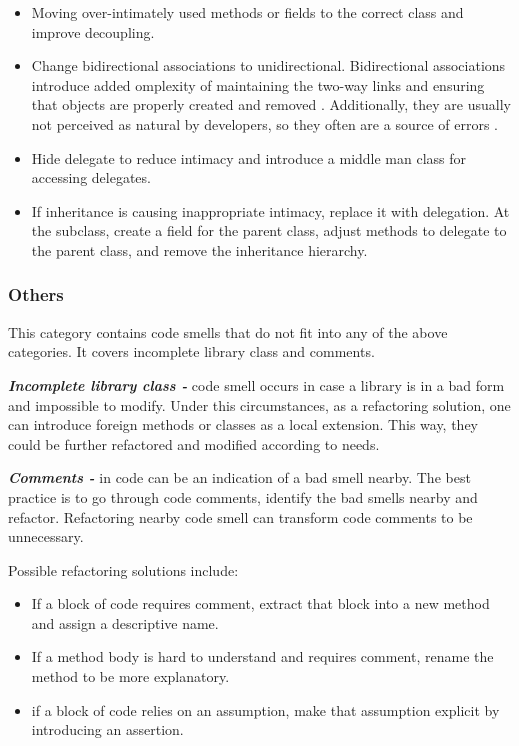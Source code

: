 \begin{itemize}
\item Moving over-intimately used methods or fields to the correct class and improve decoupling.
\item Change bidirectional associations to unidirectional. Bidirectional associations introduce added omplexity of maintaining the two-way links and ensuring that objects are properly created and removed \cite{fowlerRefactor}. Additionally, they are usually not perceived as natural by developers, so they often are a source of errors \cite{fowlerRefactor}.
\item Hide delegate to reduce intimacy and introduce a middle man class for accessing delegates.
\item If inheritance is causing inappropriate intimacy, replace it with delegation. At the subclass, create a field for the parent class, adjust methods to delegate to the parent class, and remove the inheritance hierarchy.
\end{itemize}

\subsubsection*{Others}
This category contains code smells that do not fit into any of the above categories. It covers incomplete library class and comments.

\textit{\textbf{Incomplete library class -}} code smell occurs in case a library is in a bad form and impossible to modify. Under this circumstances, as a refactoring solution, one can introduce foreign methods or classes as a local extension. This way, they could be further refactored and modified according to needs. 
 
\textit{\textbf{Comments -}} in code can be an indication of a bad smell nearby. The best practice is to go through code comments, identify the bad smells nearby and refactor. Refactoring nearby code smell can transform code comments to be unnecessary.

Possible refactoring solutions include:

\begin{itemize}
\item If a block of code requires comment, extract that block into a new method and assign a descriptive name.
\item If a method body is hard to understand and requires comment, rename the method to be more explanatory.
\item if a block of code relies on an assumption, make that assumption explicit by introducing an assertion.
\end{itemize}

